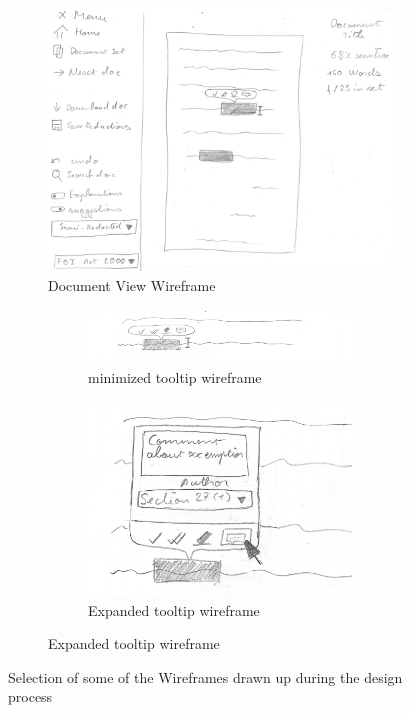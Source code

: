 \documentclass[\version]{l4proj}
\begin{document}
\begin{figure}[H]
    \centering
    \begin{subfigure}[b]{\linewidth}
        \centering
        \includegraphics[width=0.55\linewidth]{images/wireframes/doc_view.jpg}
        \caption{Document View Wireframe}\label{fig:document-wireframe}
    \end{subfigure}
    \begin{subfigure}[b]{\linewidth}
        \begin{subfigure}[b]{0.54\linewidth}
            \includegraphics[width=\linewidth]{images/wireframes/tooltip.jpg}
            \caption{minimized tooltip wireframe}\label{fig:tooltip-wireframe}
        \end{subfigure}
        \begin{subfigure}[b]{0.35\linewidth}
            \includegraphics[width=\linewidth]{images/wireframes/tooltip_comment.jpg}
            \caption{Expanded tooltip wireframe}\label{fig:expanded-tooltip-wireframe}
        \end{subfigure}
    \end{subfigure}
    \caption{Selection of some of the Wireframes drawn up during the design process}\label{fig:wireframes}

\end{figure}
\end{document}
